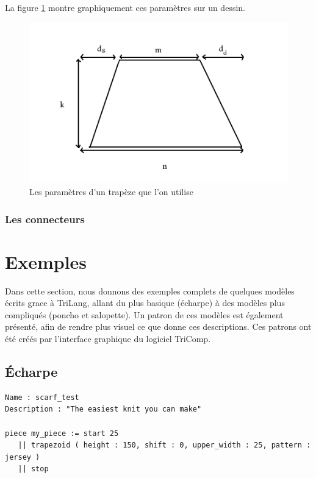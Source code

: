 \documentclass[a4paper,10pt]{article}
\begin{document}
La figure \ref{trapeze} montre graphiquement ces paramètres sur un dessin.

\begin{figure}[!ht]
  \centering \includegraphics[scale=0.6]{../img/trapeze.jpg}
  \caption{Les paramètres d'un trapèze que l'on utilise}
  \label{trapeze}
\end{figure}

\subsubsection{Les connecteurs}

  

\appendix

\section{Exemples}

Dans cette section, nous donnons des exemples complets de quelques modèles écrits grace à TriLang, allant du plus basique (écharpe) à des modèles plus compliqués (poncho et salopette). Un patron de ces modèles est également présenté, afin de rendre plus visuel ce que donne ces descriptions. Ces patrons ont été créés par l'interface graphique du logiciel TriComp.

\subsection{Écharpe}



\begin{lstlisting}
Name : scarf_test
Description : "The easiest knit you can make"

piece my_piece := start 25
   || trapezoid ( height : 150, shift : 0, upper_width : 25, pattern : jersey )
   || stop
\end{lstlisting}
\end{document}
